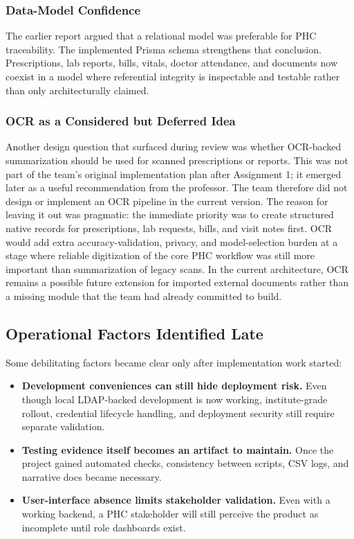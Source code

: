 \documentclass[conference]{IEEEtran}
\begin{document}
\subsubsection{Data-Model Confidence}
The earlier report argued that a relational model was preferable for PHC traceability. The implemented Prisma schema strengthens that conclusion. Prescriptions, lab reports, bills, vitals, doctor attendance, and documents now coexist in a model where referential integrity is inspectable and testable rather than only architecturally claimed.

\subsubsection{OCR as a Considered but Deferred Idea}
Another design question that surfaced during review was whether OCR-backed summarization should be used for scanned prescriptions or reports. This was not part of the team's original implementation plan after Assignment 1; it emerged later as a useful recommendation from the professor. The team therefore did not design or implement an OCR pipeline in the current version. The reason for leaving it out was pragmatic: the immediate priority was to create structured native records for prescriptions, lab requests, bills, and visit notes first. OCR would add extra accuracy-validation, privacy, and model-selection burden at a stage where reliable digitization of the core PHC workflow was still more important than summarization of legacy scans. In the current architecture, OCR remains a possible future extension for imported external documents rather than a missing module that the team had already committed to build.

\subsection{Operational Factors Identified Late}
Some debilitating factors became clear only after implementation work started:
\begin{itemize}
    \item \textbf{Development conveniences can still hide deployment risk.} Even though local LDAP-backed development is now working, institute-grade rollout, credential lifecycle handling, and deployment security still require separate validation.
    \item \textbf{Testing evidence itself becomes an artifact to maintain.} Once the project gained automated checks, consistency between scripts, CSV logs, and narrative docs became necessary.
    \item \textbf{User-interface absence limits stakeholder validation.} Even with a working backend, a PHC stakeholder will still perceive the product as incomplete until role dashboards exist.
\end{itemize}
\end{document}
